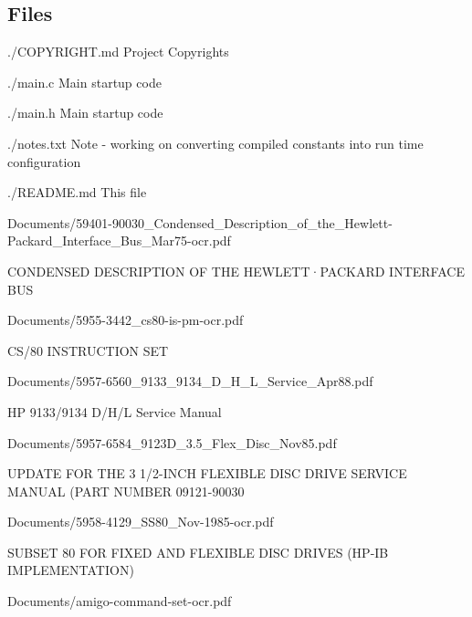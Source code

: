 \begin{DoxyPre}\subsection*{Files}\end{DoxyPre}



\begin{DoxyPre}
\begin{DoxyItemize}
\item ./COPYRIGHT.md
    Project Copyrights
\item ./main.c
    Main startup code
\item ./main.h
    Main startup code
\item ./notes.txt
    Note - working on converting compiled constants into run time configuration
\item ./README.md
    This file
\item Documents/59401-90030\_Condensed\_Description\_of\_the\_Hewlett-Packard\_Interface\_Bus\_Mar75-ocr.pdf
\begin{DoxyItemize}
\item CONDENSED DESCRIPTION OF THE HEWLETT·PACKARD INTERFACE BUS
\end{DoxyItemize}
\item Documents/5955-3442\_cs80-is-pm-ocr.pdf
\begin{DoxyItemize}
\item CS/80 INSTRUCTION SET
\end{DoxyItemize}
\item Documents/5957-6560\_9133\_9134\_D\_H\_L\_Service\_Apr88.pdf
\begin{DoxyItemize}
\item HP 9133/9134 D/H/L Service Manual
\end{DoxyItemize}
\item Documents/5957-6584\_9123D\_3.5\_Flex\_Disc\_Nov85.pdf
\begin{DoxyItemize}
\item UPDATE FOR THE 3 1/2-INCH FLEXIBLE DISC DRIVE SERVICE MANUAL (PART NUMBER 09121-90030
\end{DoxyItemize}
\item Documents/5958-4129\_SS80\_Nov-1985-ocr.pdf
\begin{DoxyItemize}
\item SUBSET 80 FOR FIXED AND FLEXIBLE DISC DRIVES (HP-IB IMPLEMENTATION)
\end{DoxyItemize}
\item Documents/amigo-command-set-ocr.pdf

\end{DoxyItemize}
\end{DoxyPre}
